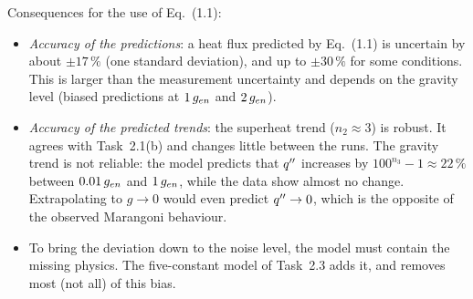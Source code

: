Consequences for the use of Eq.~(1.1):
\begin{itemize}
  \item \emph{Accuracy of the predictions}: a heat flux predicted by Eq.~(1.1) is uncertain by about
        $\pm17\,\%$ (one standard deviation), and up to $\pm30\,\%$ for some conditions. This is larger
        than the measurement uncertainty and depends on the gravity level (biased predictions at
        $1\,g_{en}$ and $2\,g_{en}$).
  \item \emph{Accuracy of the predicted trends}: the superheat trend ($n_2\approx3$) is robust. It agrees
        with Task~2.1(b) and changes little between the runs. The gravity trend is not reliable: the
        model predicts that $q''$ increases by $100^{n_3}-1\approx22\,\%$ between $0.01\,g_{en}$ and
        $1\,g_{en}$, while the data show almost no change. Extrapolating to $g\to0$ would even predict
        $q''\to0$, which is the opposite of the observed Marangoni behaviour.
  \item To bring the deviation down to the noise level, the model must contain the missing physics. The
        five-constant model of Task~2.3 adds it, and removes most (not all) of this bias.
\end{itemize}
